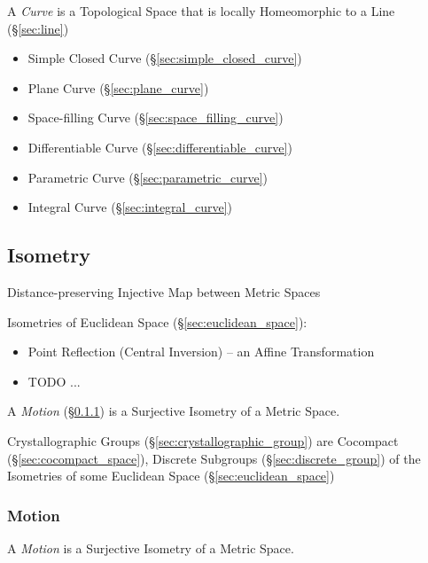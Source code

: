 A \emph{Curve} is a Topological Space that is locally Homeomorphic to a Line
(\S\ref{sec:line})

\begin{itemize}
  \item Simple Closed Curve (\S\ref{sec:simple_closed_curve})
  \item Plane Curve (\S\ref{sec:plane_curve})
  \item Space-filling Curve (\S\ref{sec:space_filling_curve})
  \item Differentiable Curve (\S\ref{sec:differentiable_curve})
  \item Parametric Curve (\S\ref{sec:parametric_curve})
  \item Integral Curve (\S\ref{sec:integral_curve})
\end{itemize}



\subsection{Isometry}\label{sec:isometry}

Distance-preserving Injective Map between Metric Spaces

Isometries of Euclidean Space (\S\ref{sec:euclidean_space}):
\begin{itemize}
  \item Point Reflection (Central Inversion) -- an Affine Transformation
  \item TODO
  ...
\end{itemize}

A \emph{Motion} (\S\ref{sec:motion}) is a Surjective Isometry of a Metric
Space.

Crystallographic Groups (\S\ref{sec:crystallographic_group}) are Cocompact
(\S\ref{sec:cocompact_space}), Discrete Subgroups (\S\ref{sec:discrete_group})
of the Isometries of some Euclidean Space (\S\ref{sec:euclidean_space})



\subsubsection{Motion}\label{sec:motion}


A \emph{Motion} is a Surjective Isometry of a Metric Space.




